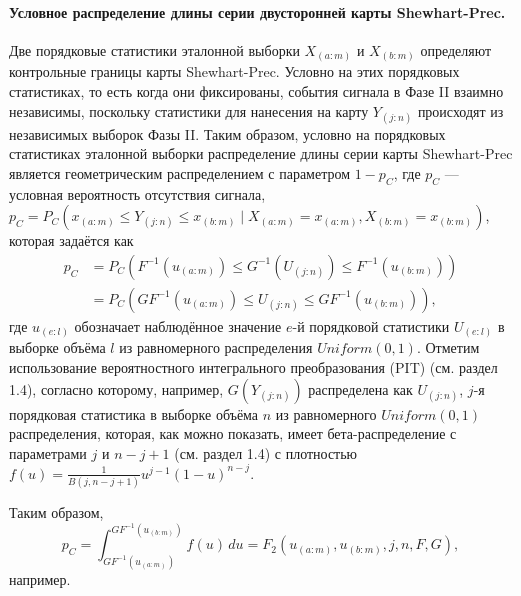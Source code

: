\paragraph{Условное распределение длины серии двусторонней карты Shewhart-Prec.} Две порядковые статистики эталонной выборки \(X_{(a:m)}\) и \(X_{(b:m)}\) определяют контрольные границы карты Shewhart-Prec. Условно на этих порядковых статистиках, то есть когда они фиксированы, события сигнала в Фазе II взаимно независимы, поскольку статистики для нанесения на карту \(Y_{(j:n)}\) происходят из независимых выборок Фазы II. Таким образом, условно на порядковых статистиках эталонной выборки распределение длины серии карты Shewhart-Prec является геометрическим распределением с параметром \(1 - p_C\), где \(p_C\) --- условная вероятность отсутствия сигнала, \(p_C = P_C\left( x_{(a:m)} \le Y_{(j:n)} \le x_{(b:m)} \mid X_{(a:m)} = x_{(a:m)}, X_{(b:m)} = x_{(b:m)} \right)\), которая задаётся как
\begin{equation}
\begin{aligned}
	p_C &= P_C\left( F^{-1}\left(u_{(a:m)}\right) \le G^{-1}\left(U_{(j:n)}\right) \le F^{-1}\left(u_{(b:m)}\right) \right) \\
	    &= P_C\left( GF^{-1}\left(u_{(a:m)}\right) \le U_{(j:n)} \le GF^{-1}\left(u_{(b:m)}\right) \right),
\end{aligned}
\label{eq:4.27}
\end{equation}
где \(u_{(e:l)}\) обозначает наблюдённое значение \(e\)-й порядковой статистики \(U_{(e:l)}\) в выборке объёма \(l\) из равномерного распределения \(Uniform(0, 1)\). Отметим использование вероятностного интегрального преобразования (PIT) (см. раздел 1.4), согласно которому, например, \(G\left(Y_{(j:n)}\right)\) распределена как \(U_{(j:n)}\), \(j\)-я порядковая статистика в выборке объёма \(n\) из равномерного \(Uniform(0, 1)\) распределения, которая, как можно показать, имеет бета-распределение с параметрами \(j\) и \(n - j + 1\) (см. раздел 1.4) с плотностью \(f(u) = \frac{1}{B(j, n - j + 1)}u^{j-1}(1 - u)^{n-j}\).

Таким образом,
\[
	p_C = \int_{GF^{-1}(u_{(a:m)})}^{GF^{-1}(u_{(b:m)})} f(u)\,du = F_2\left( u_{(a:m)}, u_{(b:m)}, j, n, F, G \right),
\]
например.

